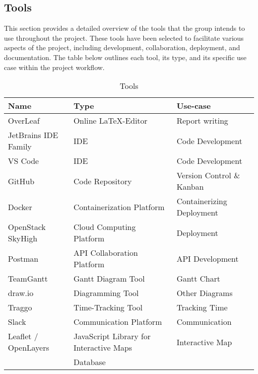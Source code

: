 \begin{comment}
    - GitOps som et sentralt konsept
    - Bruke CI/CD Pipelines i GitHubfor å automatisere så mye som mulig
    f.eks. statiske kodesjekker og inspections, unittester og integrasjonstester, også deployment for å kunne ha manuelle inspeksjoner og tester during development.
    - Linting for Go (eks. golangci-lint).
    - Plan om usertesting etter vi har MVP på plass midt i mars, jobbe utifra kravspesifikasjon og tilbakemelding fra productowner fram til det.
    
\end{comment}

\subsection{Tools}\label{sec:tools}
This section provides a detailed overview of the tools that the group intends to use throughout the project. These tools have been selected to facilitate various aspects of the project, including development, collaboration, deployment, and documentation. The table below outlines each tool, its type, and its specific use case within the project workflow.
\begin{table} [H]
    \centering
    \begin{tabular}{|l|l|l|}
    \hline
    Name & Type & Use-case \\
    \hline
    OverLeaf & Online \LaTeX-Editor & Report writing \\
    JetBrains IDE Family & IDE & Code Development \\
    VS Code & IDE & Code Development \\
    GitHub & Code Repository & Version Control \& Kanban \\
    Docker & Containerization Platform & Containerizing Deployment \\
    OpenStack SkyHigh & Cloud Computing Platform & Deployment \\
    Postman & API Collaboration Platform & API Development \\
    TeamGantt & Gantt Diagram Tool & Gantt Chart \\
    draw.io & Diagramming Tool & Other Diagrams \\
    Traggo & Time-Tracking Tool & Tracking Time \\
    Slack & Communication Platform & Communication \\
    Leaflet / OpenLayers & JavaScript Library for Interactive Maps & Interactive Map  \\
     & Database & \\
    \hline
    \end{tabular}
    \caption{Tools}
    \label{tab:tools}
\end{table}

